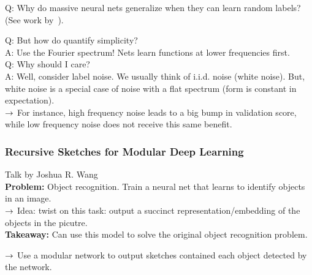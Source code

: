 Q: Why do massive neural nets generalize when they can learn random labels? (See work by~\citet{arpit2017closer}). \\


Q: But how do quantify simplicity? \\

A: Use the Fourier spectrum! Nets learn functions at lower frequencies first. \\

Q: Why should I care? \\

A: Well, consider label noise. We usually think of i.i.d. noise (white noise). But, white noise is a special case of noise with a flat spectrum (form is constant in expectation). \\

$\rightarrow$ For instance, high frequency noise leads to a big bump in validation score, while low frequency noise does not receive this same benefit. \\

\spacerule

\subsubsection{Recursive Sketches for Modular Deep Learning~\cite{ghazi2019recursive}}

Talk by Joshua R. Wang \\

{\bf Problem:} Object recognition. Train a neural net that learns to identify objects in an image. \\

$\rightarrow$ Idea: twist on this task: output a succinct representation/embedding of the objects in the picutre. \\

{\bf Takeaway:} Can use this model to solve the original object recognition problem. \\


$\rightarrow$ Use a modular network to output sketches contained each object detected by the network.\\

